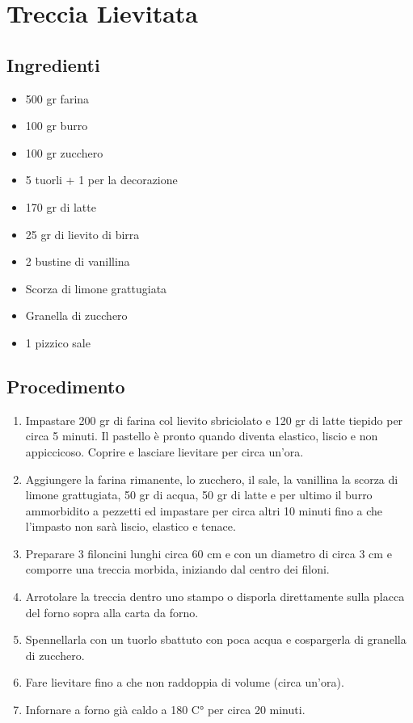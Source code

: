 \section{Treccia Lievitata}
\subsection{Ingredienti}
\begin{itemize}
\item 500 gr farina  
\item 100 gr burro  
\item 100 gr zucchero  
\item 5 tuorli + 1 per la decorazione   
\item 170 gr di latte  
\item 25 gr di lievito di birra  
\item 2 bustine di vanillina  
\item Scorza di limone grattugiata  
\item Granella di zucchero  
\item 1 pizzico sale
\end{itemize}
\subsection{Procedimento}
\begin{enumerate}
\item  Impastare 200 gr di farina col lievito sbriciolato e 120 gr di latte tiepido per circa 5 minuti. Il pastello è pronto quando diventa elastico, liscio e non appiccicoso. Coprire e lasciare lievitare per circa un'ora.  
\item  Aggiungere la farina rimanente, lo zucchero, il sale, la vanillina la scorza di limone grattugiata, 50 gr di acqua, 50 gr di latte e per ultimo il burro ammorbidito a pezzetti ed impastare per circa altri 10 minuti fino a che l'impasto non sarà liscio, elastico e tenace.   
\item  Preparare 3 filoncini lunghi circa 60 cm e con un diametro di circa 3 cm e comporre una treccia morbida, iniziando dal centro dei filoni.   
\item  Arrotolare la treccia dentro uno stampo o disporla direttamente sulla placca del forno sopra alla carta da forno.   
\item  Spennellarla con un tuorlo sbattuto con poca acqua e cospargerla di granella di zucchero.  
\item  Fare lievitare fino a che non raddoppia di volume (circa un'ora).   
\item  Infornare a forno già caldo a 180 C° per circa 20 minuti.
\end{enumerate}
